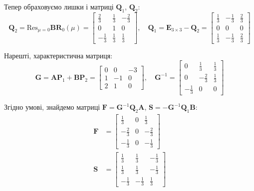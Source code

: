 \documentclass{hw_template}
\begin{document}
Тепер обраховуємо лишки і матриці $\boldsymbol{Q}_1$, $\boldsymbol{Q}_2$:
\begin{equation*}
    \boldsymbol{Q}_2 = \text{Res}_{\mu=0}\boldsymbol{BR}_0(\mu) = 
    \begin{bmatrix}
        \frac{2}{3} & \frac{1}{3} & -\frac{2}{3} \\
        0 & 1 & 0 \\
        -\frac{1}{3} & \frac{1}{3} & \frac{1}{3}
    \end{bmatrix}, \quad \boldsymbol{Q}_1 = \boldsymbol{E}_{3 \times 3} - 
    \boldsymbol{Q}_2 = \begin{bmatrix}
        \frac{1}{3} & -\frac{1}{3} & \frac{2}{3} \\
        0 & 0 & 0 \\
        \frac{1}{3} & -\frac{1}{3} & \frac{2}{3}
    \end{bmatrix}
\end{equation*}

Нарешті, характеристична матриця:
\begin{equation*}
    \boldsymbol{G} = \boldsymbol{AP}_1 + \boldsymbol{BP}_2 = \begin{bmatrix}
        0 & 0 & -3 \\
        1 & -1 & 0 \\
        2 & 1 & 0
    \end{bmatrix}, \quad \boldsymbol{G}^{-1} = \begin{bmatrix}
        0 & \frac{1}{3} & \frac{1}{3} \\
        0 & -\frac{2}{3} & \frac{1}{3} \\
        -\frac{1}{3} & 0 & 0
    \end{bmatrix}
\end{equation*}

Згідно умові, знайдемо матриці $\boldsymbol{F} =
\boldsymbol{G}^{-1}\boldsymbol{Q}_2\boldsymbol{A}$, $\boldsymbol{S} =
-\boldsymbol{G}^{-1}\boldsymbol{Q}_1\boldsymbol{B}$:
\begin{align*}
    \boldsymbol{F} &= \begin{bmatrix}
        \frac{1}{3} & 0 & \frac{1}{3} \\
        -\frac{2}{3} & 0 & -\frac{2}{3} \\
        -\frac{1}{3} & 0 & -\frac{1}{3}
    \end{bmatrix} \\
    \boldsymbol{S} &= \begin{bmatrix}
        \frac{1}{3} & \frac{1}{3} & -\frac{1}{3} \\
        \frac{1}{3} & \frac{1}{3} & -\frac{1}{3} \\
        -\frac{1}{3} & -\frac{1}{3} & \frac{1}{3}
    \end{bmatrix}
\end{align*}
\end{document}
